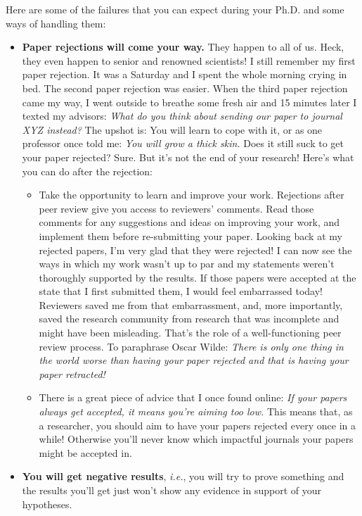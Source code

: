 \documentclass[10pt,twocolumn]{article}
\begin{document}
Here are some of the failures that you can expect during your Ph.D. and some ways of handling them:

\begin{itemize}
\item \textbf{Paper rejections will come your way.} They happen to all of us. Heck, they even happen to senior and renowned scientists! I still remember my first paper rejection. It was a Saturday and I spent the whole morning crying in bed. The second paper rejection was easier. When the third paper rejection came my way, I went outside to breathe some fresh air and 15 minutes later I texted my advisors: \textit{What do you think about sending our paper to journal XYZ instead?} The upshot is: You will learn to cope with it, or as one professor once told me: \textit{You will grow a thick skin.} Does it still suck to get your paper rejected? Sure. But it’s not the end of your research! Here’s what you can do after the rejection:

\begin{itemize}
\item Take the opportunity to learn and improve your work. Rejections after peer review give you access to reviewers’ comments. Read those comments for any suggestions and ideas on improving your work, and implement them before re-submitting your paper. Looking back at my rejected papers, I’m very glad that they were rejected! I can now see the ways in which my work wasn’t up to par and my statements weren’t thoroughly supported by the results. If those papers were accepted at the state that I first submitted them, I would feel embarrassed today! Reviewers saved me from that embarrassment, and, more importantly, saved the research community from research that was incomplete and might have been misleading. That’s the role of a well-functioning peer review process. To paraphrase Oscar Wilde: \textit{There is only one thing in the world worse than having your paper rejected and that is having your paper retracted!}

\item There is a great piece of advice that I once found online: \textit{If your papers always get accepted, it means you’re aiming too low.} This means that, as a researcher, you should aim to have your papers rejected every once in a while! Otherwise you’ll never know which impactful journals your papers might be accepted in.
\end{itemize}

\item \textbf{You will get negative results}, \textit{i.e.}, you will try to prove something and the results you’ll get just won’t show any evidence in support of your hypotheses.


\end{itemize}
\end{document}
